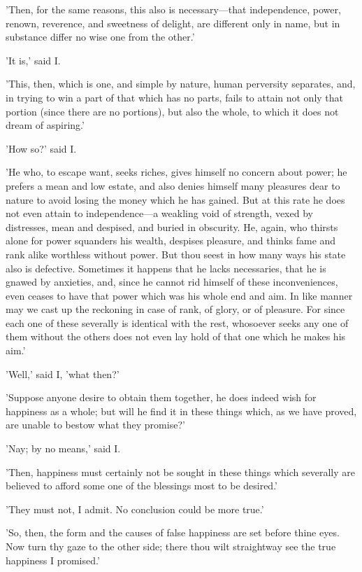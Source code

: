 'Then, for the same reasons, this also is necessary—that independence,
power, renown, reverence, and sweetness of delight, are different only
in name, but in substance differ no wise one from the other.'

'It is,' said I.

'This, then, which is one, and simple by nature, human perversity
separates, and, in trying to win a part of that which has no parts,
fails to attain not only that portion (since there are no portions), but
also the whole, to which it does not dream of aspiring.'

'How so?' said I.

'He who, to escape want, seeks riches, gives himself no concern about
power; he prefers a mean and low estate, and also denies himself many
pleasures dear to nature to avoid losing the money which he has gained.
But at this rate he does not even attain to independence—a weakling
void of strength, vexed by distresses, mean and despised, and buried in
obscurity. He, again, who thirsts alone for power squanders his wealth,
despises pleasure, and thinks fame and rank alike worthless without
power. But thou seest in how many ways his state also is defective.
Sometimes it happens that he lacks necessaries, that he is gnawed by
anxieties, and, since he cannot rid himself of these inconveniences,
even ceases to have that power which was his whole end and aim. In like
manner may we cast up the reckoning in case of rank, of glory, or of
pleasure. For since each one of these severally is identical with the
rest, whosoever seeks any one of them without the others does not even
lay hold of that one which he makes his aim.'

'Well,' said I, 'what then?'

'Suppose anyone desire to obtain them together, he does indeed wish for
happiness as a whole; but will he find it in these things which, as we
have proved, are unable to bestow what they promise?'

'Nay; by no means,' said I.

'Then, happiness must certainly not be sought in these things which
severally are believed to afford some one of the blessings most to be
desired.'

'They must not, I admit. No conclusion could be more true.'

'So, then, the form and the causes of false happiness are set before
thine eyes. Now turn thy gaze to the other side; there thou wilt
straightway see the true happiness I promised.'

